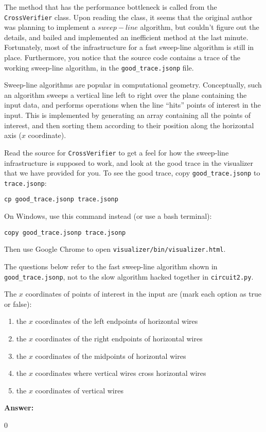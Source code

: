 \documentclass[12pt,twoside]{article}
\newcommand{\answer}{
 \par\medskip
 \textbf{Answer:}
}
\newcommand{\answerIIc}{ \answer
0
}
\begin{document}
\begin{problems}
\begin{problemparts}
\end{problemparts}

The method that has the performance bottleneck is called from the 
\texttt{CrossVerifier} class. Upon reading the class, it seems that the original
author was planning to implement a $sweep-line$ algorithm, but couldn’t figure out
the details, and bailed and implemented an inefficient method at the last minute.
Fortunately, most of the infrastructure for a fast sweep-line algorithm is still
in place. Furthermore, you notice that the source code contains a trace of the
working sweep-line algorithm, in the \texttt{good\_trace.jsonp} file.

Sweep-line algorithms are popular in computational geometry. Conceptually, such an
algorithm sweeps a vertical line left to right over the plane containing the input
data, and performs operations when the line “hits” points of interest in the input.
This is implemented by generating an array containing all the points of interest, and
then sorting them according to their position along the horizontal axis ($x$
coordinate).

Read the source for \texttt{CrossVerifier} to get a feel for how the sweep-line
infrastructure is supposed to work, and look at the good trace in the visualizer
that we have provided for you. To see the good trace, copy
\texttt{good\_trace.jsonp} to \texttt{trace.jsonp}:

\texttt{cp good\_trace.jsonp trace.jsonp}

On Windows, use this command instead (or use a bash terminal):

\texttt{copy good\_trace.jsonp trace.jsonp}

Then use Google Chrome to open \texttt{visualizer/bin/visualizer.html}.

The questions below refer to the fast sweep-line algorithm shown in
\texttt{good\_trace.jsonp}, not to the slow algorithm hacked together
in \texttt{circuit2.py}.

\begin{problemparts}

\problempart {} The $x$ coordinates of points of interest in the input
are (mark each option as true or false):
\begin{enumerate}
  \item the $x$ coordinates of the left endpoints of horizontal wires
  \item the $x$ coordinates of the right endpoints of horizontal wires
  \item the $x$ coordinates of the midpoints of horizontal wires
  \item the $x$ coordinates where vertical wires cross horizontal wires
  \item the $x$ coordinates of vertical wires
\end{enumerate}
\answerIIc 


\end{problemparts}
\end{problems}
\end{document}
